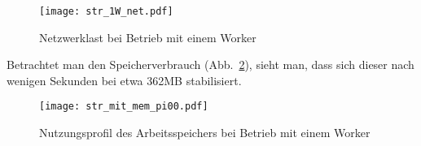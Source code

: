 \begin{figure}[ht!]
	\centering
	\texttt{[image: str\_1W\_net.pdf]}
	\caption{Netzwerklast bei Betrieb mit einem Worker}
	\label{figure:str_1W_net}
\end{figure}

Betrachtet man den Speicherverbrauch (Abb.~\ref{figure:str_mit_mem_pi00}), sieht man, dass sich dieser nach wenigen Sekunden bei etwa 362MB stabilisiert.

\begin{figure}[ht!]
	\centering
	\texttt{[image: str\_mit\_mem\_pi00.pdf]}
	\caption{Nutzungsprofil des Arbeitsspeichers bei Betrieb mit einem Worker}
	\label{figure:str_mit_mem_pi00}
\end{figure}